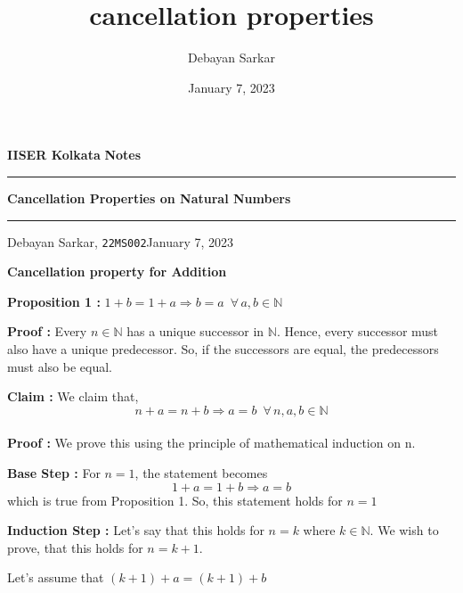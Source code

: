 \documentclass[10pt]{article}
\title{cancellation properties}
\author{Debayan Sarkar}
\date{January 7, 2023}
\newcommand{\nn}{\mathbb{N}}
\begin{document}
        \par\textbf{IISER Kolkata} \hfill \textbf{Notes}
        \vspace{3pt}
        \hrule
        \vspace{3pt}
        \begin{center}
                \LARGE{\textbf{Cancellation Properties on Natural Numbers}}
        \end{center}
        \vspace{3pt}
        \hrule
        \vspace{3pt}
        Debayan Sarkar, \texttt{22MS002}\hfill January 7, 2023
        \vspace{20pt}
        \begin{center}
            \Large{\textbf{Cancellation property for Addition}}
        \end{center}
        \vspace{20pt}
        \textbf{Proposition 1 : } $1 + b = 1 + a \Rightarrow b = a \,\,\, \forall \, a, b \in \nn$

        \textbf{Proof : } Every $n \in \nn$ has a unique successor in $\nn$. Hence, every successor must also have a unique predecessor. So, if the successors are equal, the predecessors must also be equal.

        \textbf{Claim : }
        We claim that, 
        $$n + a = n + b \Rightarrow a = b \,\,\, \forall \, n, a , b \in \nn$$\\
        \textbf{Proof : }We prove this using the principle of mathematical induction on n.

        \textbf{Base Step : }For $n = 1$, the statement becomes $$1 + a = 1 + b \Rightarrow a = b$$ which is true from Proposition 1. So, this statement holds for $n = 1$

        \textbf{Induction Step : }Let's say that this holds for $n = k$ where $k \in \nn$. We wish to prove, that this holds for $n = k + 1$. 

        Let's assume that $(k+1) + a = (k + 1) + b$
\end{document}
